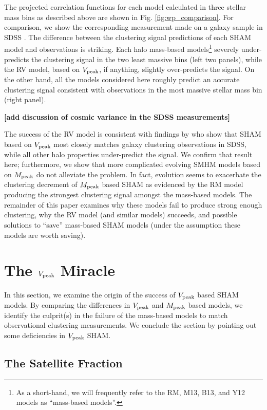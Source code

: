 \documentclass[a4paper,fleqn,usenatbib]{mnras}
\begin{document}
The projected correlation functions for each model calculated in three stellar mass bins as described above are shown in Fig. \ref{fig:wp_comparison}.  For comparison, we show the corresponding measurement made on a galaxy sample in SDSS \citep[``Mass-limit'' sample in][]{Yang:2012ew}.  The difference between the clustering signal predictions of each SHAM model and observations is striking.  Each halo mass-based models\footnote{As a short-hand, we will frequently refer to the RM, M13, B13, and Y12 models as ``mass-based models''.} severely under-predicts the clustering signal in the two least massive bins (left two panels), while the RV model, based on $V_{\rm peak}$, if anything, slightly over-predicts the signal.  On the other hand, all the models considered here roughly predict an accurate clustering signal consistent with observations in the most massive stellar mass bin (right panel).

{\bf [add discussion of cosmic variance in the SDSS measurements]}

The success of the RV model is consistent with findings by \cite{Reddick:2013gi} who show that SHAM based on $V_{\rm peak}$ most closely matches galaxy clustering observations in SDSS, while all other halo properties under-predict the signal.  We confirm that result here; furthermore, we show that more complicated evolving SMHM models based on $M_{\rm peak}$ do not alleviate the problem.  In fact, evolution seems to exacerbate the clustering decrement of $M_{\rm peak}$ based SHAM as evidenced by the RM model producing the strongest clustering signal amongst the mass-based models.  The remainder of this paper examines why these models fail to produce strong enough clustering, why the RV model (and similar models) succeeds, and possible solutions to ``save'' mass-based SHAM models (under the assumption these models are worth saving).  


\section{The $V_{\rm peak}$ Miracle}

In this section, we examine the origin of the success of $V_{\rm peak}$ based SHAM models.  By comparing the differences in $V_{\rm peak}$ and $M_{\rm peak}$ based models, we identify the culprit(s) in the failure of the mass-based models to match observational clustering measurements.  We conclude the section by pointing out some deficiencies in $V_{\rm peak}$ SHAM.    

\subsection{The Satellite Fraction}
\end{document}
